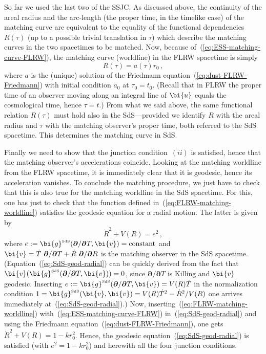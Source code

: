 \documentclass
[rmp,aps,twocolumn,showpacs,preprintnumbers,amsmath,amssymb]{revtex4}
\theoremstyle{plain}
\theoremstyle{definition}
\theoremstyle{remark}
\newcommand{\sss}{\scriptscriptstyle}
\newcommand{\ind}[1]{{\sss \text{#1}}}        %
\newcommand{\bpartial}{\boldsymbol{\partial}} %
\newcommand{\g}{\bg}                            %
\newcommand{\bg}{\bi{g}}
\newcommand{\bu}{\bi{u}}
\newcommand{\bv}{\bi{v}}
\begin{document}
So far we used the last two of the SSJC. As discussed above, the continuity 
of the areal radius and the arc-length (the proper time, in the timelike 
case) of the matching curve are equivalent to the equality of the functional 
dependencies $R(\tau)$ (up to a possible trivial translation in $\tau$) which 
describe the matching curves in the two spacetimes to be matched. 
Now, because of~(\ref{eq:ESS-matching-curve-FLRW}), the matching curve 
(worldline) in the FLRW spacetime is simply 
%
\begin{equation}\label{eq:FLRW-matching-worldline}
  R(\tau) = a(\tau)r_\ind{0} \,,
\end{equation}
%
where $a$ is the (unique) solution of the Friedmann 
equation~(\ref{eq:dust-FLRW-Friedmann}) with initial condition $a_\ind{0}$ at 
$\tau_\ind{0}=t_\ind{0}$. (Recall that in FLRW the proper time of an observer
moving along an integral line of $\bu$ equals the cosmological time, hence 
$\tau=t$.) From what we said above, the same functional relation $R(\tau)$ 
must hold also in the SdS---provided we identify $R$ with the areal radius 
and $\tau$ with the matching observer's proper time, both referred to the 
SdS spacetime. This determines the matching curve in SdS. 

Finally we need to show that the junction condition~$(ii)$ is satisfied, 
hence that the matching observer's accelerations coincide. Looking at the 
matching worldline from the FLRW spacetime, it is immediately clear that 
it is geodesic, hence its acceleration vanishes. 
To conclude the matching procedure, we just have to check that this is also 
true for the matching worldline in the SdS spacetime. For this, one has just 
to check that the function defined in~(\ref{eq:FLRW-matching-worldline}) 
satisfies the geodesic equation for a radial motion. The latter is given by 
%
\begin{equation}\label{eq:SdS-geod-radial}
  \dot{R}^2 + V(R) = e^2 \,,
\end{equation}
%
where $e:=\g^\ind{SdS}(\bpartial/\bpartial T,\bv)=\text{constant}$ and 
$\bv=\dot{T}~\bpartial/\bpartial T+\dot{R}~\bpartial/\bpartial R$ is the 
matching observer in the SdS spacetime. (Equation~(\ref{eq:SdS-geod-radial}) 
can be quickly derived from the fact that 
$\bv(\g^\ind{SdS}(\bpartial/\bpartial T,\bv))=0$, since 
$\bpartial/\bpartial T$ is Killing and $\bv$ geodesic. Inserting 
$e:=\g^\ind{SdS}(\bpartial/\bpartial T,\bv)=V(R)\dot T$ in the normalization 
condition $1=\g^\ind{SdS}(\bv,\bv)=V(R)\dot{T}^2-\dot{R}^2/V(R)$ one arrives 
immediately at~(\ref{eq:SdS-geod-radial}).)
Now, inserting~(\ref{eq:FLRW-matching-worldline}) 
with~(\ref{eq:ESS-matching-curve-FLRW}) in~(\ref{eq:SdS-geod-radial}) and 
using the Friedmann equation~(\ref{eq:dust-FLRW-Friedmann}), one gets
$\dot{R}^2 + V(R) = 1-k r_\ind{0}^2$. Hence, the geodesic 
equation~(\ref{eq:SdS-geod-radial}) is satisfied (with $e^2=1-kr_\ind{0}^2$)
and herewith all the four junction conditions.
\end{document}
